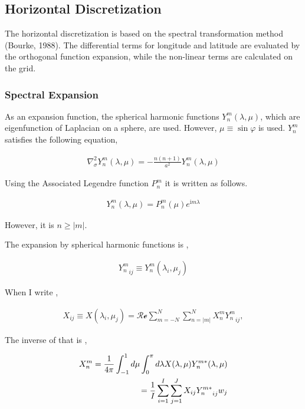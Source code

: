 \hypertarget{horizontal-discretization}{%
\subsection{Horizontal Discretization}\label{horizontal-discretization}}

The horizontal discretization is based on the spectral transformation method (Bourke, 1988). The differential terms for longitude and latitude are evaluated by the orthogonal function expansion, while
the non-linear terms are calculated on the grid.

\hypertarget{spectral-expansion}{%
\subsubsection{Spectral Expansion}\label{spectral-expansion}}

As an expansion function, the spherical harmonic functions \(Y_n^m(\lambda,\mu)\), which are eigenfunction of Laplacian on a sphere, are used. However, \(\mu \equiv \sin\varphi\) is used. \(Y_n^m\)
satisfies the following equation,

\begin{eqnarray}
\nabla^{2}_{\sigma} Y_n^m(\lambda,\mu)
= - \frac{n(n+1)}{a^{2}} Y_n^m(\lambda,\mu)
\end{eqnarray}

Using the Associated Legendre function \(P_n^m\) it is written as follows.

\begin{eqnarray}
Y_n^m(\lambda,\mu) = P_n^m (\mu) e^{\mathrm{i}m \lambda}
\end{eqnarray}

However, it is \(n \geq | m |\).

The expansion by spherical harmonic functions is ,

\begin{eqnarray}
   {Y_n^m}_{ij} \equiv Y_n^m ( \lambda_i, \mu_j )
\end{eqnarray}

When I write ,

\begin{eqnarray}
  X_{ij} \equiv X ( \lambda_i, \mu_j )
   =  \mathcal{Re} \sum_{m=-N}^{N} \sum_{n=|m|}^{N}
        X_n^m {Y_n^m}_{ij} ,
\end{eqnarray}

The inverse of that is ,

\begin{eqnarray}
  X_n^m
         =  \frac{1}{4 \pi}
             \int_{-1}^{1} d \mu \int_{0}^{\pi} d \lambda
               X( \lambda, \mu ) Y_n^{m *} ( \lambda, \mu ) \notag\\
         =  \frac{1}{I} \sum_{i=1}^{I} \sum_{j=1}^{J}  
               X_{ij} {Y_n^{m*}}_{ij} w_j
\end{eqnarray}

